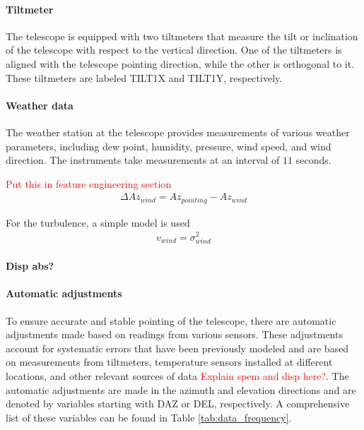 \paragraph{Tiltmeter}
The telescope is equipped with two tiltmeters that measure the tilt or inclination of the telescope with respect to the vertical direction.
One of the tiltmeters is aligned with the telescope pointing direction, while the other is orthogonal to it.
These tiltmeters are labeled TILT1X and TILT1Y, respectively.

\paragraph{Weather data}
The weather station at the telescope provides measurements of various weather parameters, including dew point, humidity, pressure, wind speed, and wind direction.
The instruments take measurements at an interval of $11$ seconds.


\textcolor{red}{Put this in feature engineering section}
\begin{align}
    \Delta \textit{Az}_\textit{wind} = \textit{Az}_\textit{pointing} - \textit{Az}_\textit{wind}
\end{align}

For the turbulence, a simple model is used
\begin{align}
v_\textit{wind} = \sigma_\textit{wind}^2
\end{align}

\paragraph{Disp abs?}

\paragraph{Automatic adjustments}
To ensure accurate and stable pointing of the telescope, there are automatic adjustments made based on readings from various sensors.
These adjustments account for systematic errors that have been previously modeled and are based on measurements from tiltmeters,
temperature sensors installed at different locations, and other relevant sources of data \textcolor{red}{Explain spem and disp here?}.
The automatic adjustments are made in the azimuth and elevation directions and are denoted by variables starting with DAZ or DEL, respectively.
A comprehensive list of these variables can be found in Table \ref{tab:data_frequency}.

